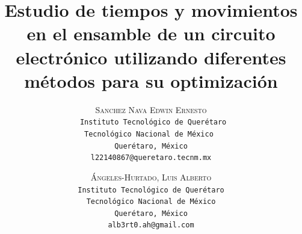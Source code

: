     \lfoot{ \thepage}
    
    \setlength{\droptitle}{-5\baselineskip} %
    \title{\textbf{Estudio de tiempos y movimientos en el ensamble de un circuito electrónico utilizando diferentes métodos para su optimización }} %
    
     \author{ 
     \textsc{Sanchez Nava Edwin Ernesto}\\ 
     \texttt{ Instituto Tecnológico de Querétaro} \\ 
     \texttt{Tecnológico Nacional de México } \\ 
     \texttt{Querétaro, México}\\ 
     \texttt{l22140867@queretaro.tecnm.mx} 
     \and 
     \textsc{Ángeles-Hurtado, Luis Alberto}\\ 
     \texttt{ Instituto Tecnológico de Querétaro } \\ 
     \texttt{ Tecnológico Nacional de México } \\ 
     \texttt{Querétaro, México}\\ 
     \texttt{alb3rt0.ah@gmail.com} 
    }
    
    
    
    
